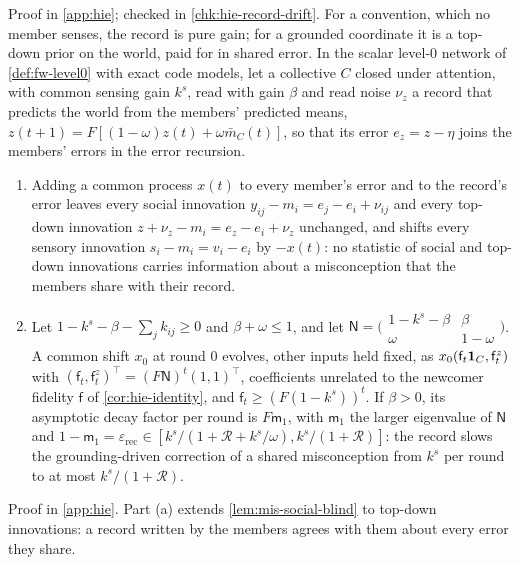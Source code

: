 Proof in \cref{app:hie}; checked in \cref{chk:hie-record-drift}. For a convention, which no member senses, the record is pure gain; for a grounded coordinate it is a top-down prior on the world, paid for in shared error. In the scalar level-0 network of \cref{def:fw-level0} with exact code models, let a collective $C$ closed under attention, with common sensing gain $k^s$, read with gain $\beta$ and read noise $\nu_z$ a record that predicts the world from the members' predicted means, $z(t+1)=F[(1-\omega)z(t)+\omega\bar m_C(t)]$, so that its error $e_z=z-\eta$ joins the members' errors in the error recursion.

\begin{lemma}\label{lem:hie-record-blind}
\leavevmode
\begin{enumerate}
\item[(a)] Adding a common process $x(t)$ to every member's error and to the record's error leaves every social innovation $y_{ij}-m_i=e_j-e_i+\nu_{ij}$ and every top-down innovation $z+\nu_z-m_i=e_z-e_i+\nu_z$ unchanged, and shifts every sensory innovation $s_i-m_i=v_i-e_i$ by $-x(t)$: no statistic of social and top-down innovations carries information about a misconception that the members share with their record.
\item[(b)] Let $1-k^s-\beta-\sum_jk_{ij}\ge0$ and $\beta+\omega\le1$, and let $\mathsf N=\bigl(\begin{smallmatrix}1-k^s-\beta&\beta\\\omega&1-\omega\end{smallmatrix}\bigr)$. A common shift $x_0$ at round $0$ evolves, other inputs held fixed, as $x_0(\mathsf f_t\mathbf{1}_C,\mathsf f^z_t)$ with $(\mathsf f_t,\mathsf f^z_t)^\top=(F\mathsf N)^t(1,1)^\top$, coefficients unrelated to the newcomer fidelity $\mathsf f$ of \cref{cor:hie-identity}, and $\mathsf f_t\ge(F(1-k^s))^t$. If $\beta>0$, its asymptotic decay factor per round is $F\mathsf m_1$, with $\mathsf m_1$ the larger eigenvalue of $\mathsf N$ and $1-\mathsf m_1=\varepsilon_{\mathrm{rec}}\in[k^s/(1+\mathcal R+k^s/\omega),k^s/(1+\mathcal R)]$: the record slows the grounding-driven correction of a shared misconception from $k^s$ per round to at most $k^s/(1+\mathcal R)$.
\end{enumerate}
\end{lemma}

Proof in \cref{app:hie}. Part (a) extends \cref{lem:mis-social-blind} to top-down innovations: a record written by the members agrees with them about every error they share.

